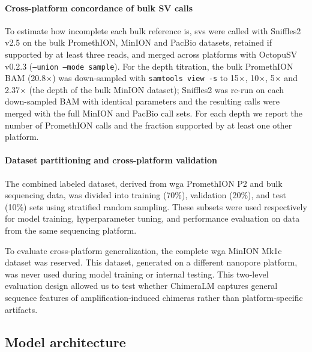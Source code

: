 \documentclass[pdflatex,lineno]{sn-jnl}%
\newif\ifrevisedtext
\newcommand{\chg}[1]{\ifrevisedtext\textcolor{revcolor}{#1}\else#1\fi}
\begin{document}
\paragraph{\chg{Cross-platform concordance of bulk SV calls}}
\chg{To estimate how incomplete each bulk reference is, \glspl{sv} were called with Sniffles2 v2.5 on the bulk PromethION, MinION and PacBio datasets, retained if supported by at least three reads, and merged across platforms with OctopuSV v0.2.3 (\texttt{--union --mode sample}).
	For the depth titration, the bulk PromethION BAM (20.8$\times$) was down-sampled with \texttt{samtools view -s} to 15$\times$, 10$\times$, 5$\times$ and 2.37$\times$ (the depth of the bulk MinION dataset); Sniffles2 was re-run on each down-sampled BAM with identical parameters and the resulting calls were merged with the full MinION and PacBio call sets.
	For each depth we report the number of PromethION calls and the fraction supported by at least one other platform.}

\paragraph{Dataset partitioning and cross-platform validation}
The combined labeled dataset, derived from \gls{wga} PromethION P2 and bulk sequencing data, was divided into training (70\%), validation (20\%), and test (10\%) sets using stratified random sampling.
These subsets were used respectively for model training, hyperparameter tuning, and performance evaluation on data from the same sequencing platform.

To evaluate cross-platform generalization, the complete \gls{wga} MinION Mk1c dataset was reserved.
This dataset, generated on a different nanopore platform, was never used during model training or internal testing.
This two-level evaluation design allowed us to test whether ChimeraLM captures general sequence features of amplification-induced chimeras rather than platform-specific artifacts.

\subsection*{Model architecture}
\end{document}
